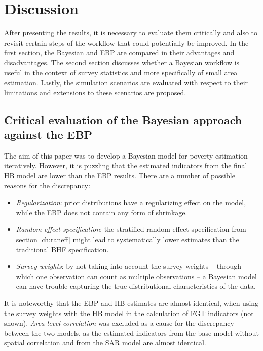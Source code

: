 \chapter{Discussion}

After presenting the results, it is necessary to evaluate them critically and also to revisit certain steps of the workflow that could potentially be improved.
In the first section, the Bayesian and EBP are compared in their advantages and disadvantages.
The second section discusses whether a Bayesian workflow is useful in the context of survey statistics and more specifically of small area estimation.
Lastly, the simulation scenarios are evaluated with respect to their limitations and extensions to these scenarios are proposed.


\section{Critical evaluation of the Bayesian approach against the EBP}
\label{ch:discussion}

The aim of this paper was to develop a Bayesian model for poverty estimation iteratively.
However, it is puzzling that the estimated indicators from the final HB model are lower than the EBP results.
There are a number of possible reasons for the discrepancy:
\begin{itemize}
    \item \textit{Regularization}: prior distributions have a regularizing effect on the model, while the EBP does not contain any form of shrinkage.
    \item \textit{Random effect specification}: the stratified random effect specification from section \ref{ch:raneff} might lead to systematically lower estimates than the traditional BHF specification.
    \item \textit{Survey weights}: by not taking into account the survey weights – through which one observation can count as multiple observations – a Bayesian model can have trouble capturing the true distributional characteristics of the data.
\end{itemize}
It is noteworthy that the EBP and HB estimates are almost identical, when using the survey weights with the HB model in the calculation of FGT indicators (not shown).
\textit{Area-level correlation} was excluded as a cause for the discrepancy between the two models, as the estimated indicators from the base model without spatial correlation and from the SAR model are almost identical.

